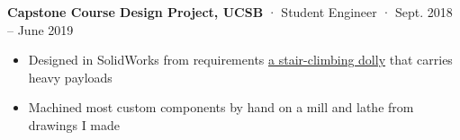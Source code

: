 \documentclass[12pt, oneside]{article}
\newcommand{\jobtitle}[3] {
	{\bf #1} · {#2} · {#3} \vspace{-7pt} \\
}
\begin{document}
\begin{flushleft}
\jobtitle{Capstone Course Design Project, UCSB}{Student Engineer}{Sept. 2018 – June 2019}
\begin{itemize}
	\item Designed in SolidWorks from requirements \href{https://portfolium.com/entry/automatic-stair-climbing-vehicle}{a stair-climbing dolly} that carries heavy payloads \\
	\item Machined most custom components by hand on a mill and lathe from drawings I made \\
\end{itemize}





\end{flushleft}
\end{document}
